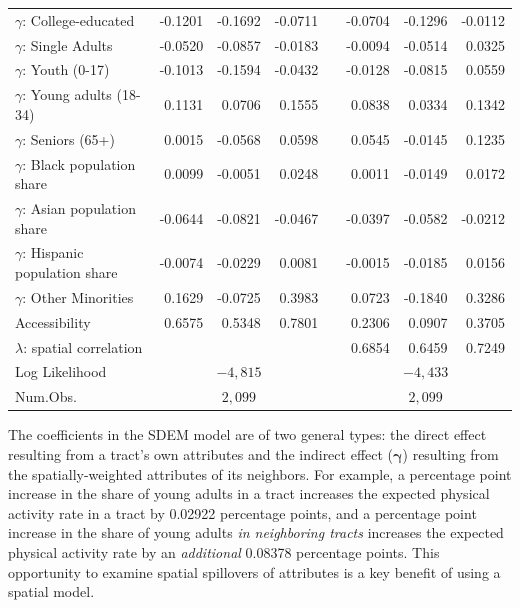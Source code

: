 \documentclass[shortAfour,sageh.bst]{sagej}
\begin{document}
\begin{table}
\begin{tabular}{l d{2.4} d{2.4} d{2.4} c d{2.4} d{2.4} d{2.4} }
  $\gamma$: College-educated & -0.1201 & -0.1692 & -0.0711 &   & -0.0704 & -0.1296 & -0.0112 \\ 
  $\gamma$: Single Adults & -0.0520 & -0.0857 & -0.0183 &   & -0.0094 & -0.0514 & 0.0325 \\ 
  $\gamma$: Youth (0-17) & -0.1013 & -0.1594 & -0.0432 &   & -0.0128 & -0.0815 & 0.0559 \\ 
  $\gamma$: Young adults (18-34) & 0.1131 & 0.0706 & 0.1555 &   & 0.0838 & 0.0334 & 0.1342 \\ 
  $\gamma$: Seniors (65+) & 0.0015 & -0.0568 & 0.0598 &   & 0.0545 & -0.0145 & 0.1235 \\ 
  $\gamma$: Black population share & 0.0099 & -0.0051 & 0.0248 &   & 0.0011 & -0.0149 & 0.0172 \\ 
  $\gamma$: Asian population share & -0.0644 & -0.0821 & -0.0467 &   & -0.0397 & -0.0582 & -0.0212 \\ 
  $\gamma$: Hispanic population share & -0.0074 & -0.0229 & 0.0081 &   & -0.0015 & -0.0185 & 0.0156 \\ 
  $\gamma$: Other Minorities & 0.1629 & -0.0725 & 0.3983 &   & 0.0723 & -0.1840 & 0.3286 \\ 
  Accessibility & 0.6575 & 0.5348 & 0.7801 &   & 0.2306 & 0.0907 & 0.3705 \\ 
  $\lambda$: spatial correlation &  &  &  &   & 0.6854 & 0.6459 & 0.7249 \\ 
  
\midrule
Log Likelihood &  & & \\
Num.Obs.       &    & & \\
\bottomrule
\end{tabular}
\end{table}

The coefficients in the SDEM model are of two general types: the direct
effect resulting from a tract's own attributes and the indirect effect
(\(\boldsymbol{\gamma}\)) resulting from the spatially-weighted
attributes of its neighbors. For example, a percentage point increase in
the share of young adults in a tract increases the expected physical
activity rate in a tract by 0.02922 percentage points, and a percentage
point increase in the share of young adults \emph{in neighboring tracts}
increases the expected physical activity rate by an \emph{additional}
0.08378 percentage points. This opportunity to examine spatial
spillovers of attributes is a key benefit of using a spatial model.
\end{document}
